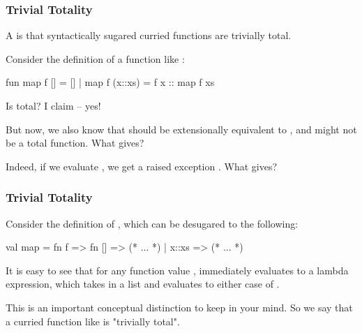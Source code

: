 \documentclass[aspectratio=169]{beamer}
\begin{document}
\begin{frame}[fragile]
  \frametitle{Trivial Totality}

  A  is that syntactically sugared curried functions are trivially total\footnotemark.  

  \pause
  \vspace{\fill}

  Consider the definition of a function like :

  \pause
  \vspace{5pt}

  \begin{codeblock}
    fun map f [] = []
      | map f (x::xs) = f x :: map f xs
  \end{codeblock}

  \pause
  \vspace{\fill}

  Is  total? I claim -- yes!

  \pause
  \vspace{\fill}

  But now, we also know that  should be extensionally
  equivalent to \code{[f 1, f 2, f 3]}, and  might not be a total function.
  What gives?

  \pause
  \vspace{\fill}

  Indeed, if we evaluate , we get a
  raised exception . What gives?

\end{frame}

\begin{frame}[fragile]
  \frametitle{Trivial Totality}


  \pause
  \vspace{\fill}

  Consider the definition of , which can be desugared to the following:
  \begin{codeblock}
    val map = fn f => fn [] => (* ... *) | x::xs => (* ... *)
  \end{codeblock}

  \pause
  \vspace{\fill}

  It is easy to see that for any function value ,  immediately
  evaluates to a lambda expression, which takes in a list and evaluates to either
  case of . 

  \pause
  \vspace{\fill}

  This is an important conceptual distinction to keep in your mind. So we say that
  a curried function like  is "trivially total".
\end{frame}
\end{document}
